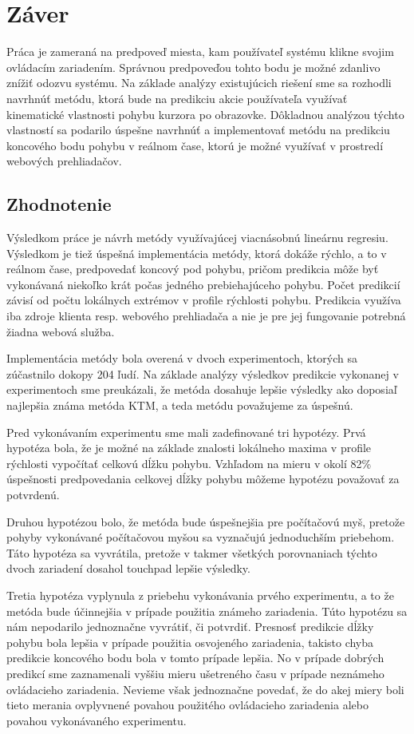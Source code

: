 \chapter{Záver}

Práca je zameraná na predpoveď miesta, kam používateľ systému klikne svojim ovládacím zariadením. Správnou predpoveďou tohto bodu je možné zdanlivo znížiť odozvu systému. Na základe analýzy existujúcich riešení sme sa rozhodli navrhnúť metódu, ktorá bude na predikciu akcie používateľa využívať kinematické vlastnosti pohybu kurzora po obrazovke. Dôkladnou analýzou týchto vlastností sa podarilo úspešne navrhnúť a implementovať metódu na predikciu koncového bodu pohybu v reálnom čase, ktorú je možné využívať v prostredí webových prehliadačov.

\section{Zhodnotenie}
Výsledkom práce je návrh metódy využívajúcej viacnásobnú lineárnu regresiu. Výsledkom je tiež úspešná implementácia metódy, ktorá dokáže rýchlo, a to v reálnom čase, predpovedať koncový pod pohybu, pričom predikcia môže byť vykonávaná niekoľko krát počas jedného prebiehajúceho pohybu. Počet predikcií závisí od počtu lokálnych extrémov v profile rýchlosti pohybu. Predikcia využíva iba zdroje klienta resp. webového prehliadača a nie je pre jej fungovanie potrebná žiadna webová služba.

Implementácia metódy bola overená v dvoch experimentoch, ktorých sa zúčastnilo dokopy 204 ľudí. Na základe analýzy výsledkov predikcie vykonanej v experimentoch sme preukázali, že metóda dosahuje lepšie výsledky ako doposiaľ najlepšia známa metóda KTM, a teda metódu považujeme za úspešnú.

Pred vykonávaním experimentu sme mali zadefinované tri hypotézy. Prvá hypotéza bola, že je možné na základe znalosti lokálneho maxima v profile rýchlosti vypočítať celkovú dĺžku pohybu. Vzhľadom na mieru v okolí 82\% úspešnosti predpovedania celkovej dĺžky pohybu môžeme hypotézu považovať za potvrdenú.

Druhou hypotézou bolo, že metóda bude úspešnejšia pre počítačovú myš, pretože pohyby vykonávané počítačovou myšou sa vyznačujú jednoduchším priebehom. Táto hypotéza sa vyvrátila, pretože v takmer všetkých porovnaniach týchto dvoch zariadení dosahol touchpad lepšie výsledky.

Tretia hypotéza vyplynula z priebehu vykonávania prvého experimentu, a to že metóda bude účinnejšia v prípade použitia známeho zariadenia. Túto hypotézu sa nám nepodarilo jednoznačne vyvrátiť, či potvrdiť. Presnosť predikcie dĺžky pohybu bola lepšia v prípade použitia osvojeného zariadenia, takisto chyba predikcie koncového bodu bola v tomto prípade lepšia. No v prípade dobrých predikcí sme zaznamenali vyššiu mieru ušetreného času v prípade neznámeho ovládacieho zariadenia. Nevieme však jednoznačne povedať, že do akej miery boli tieto merania ovplyvnené povahou použitého ovládacieho zariadenia alebo povahou vykonávaného experimentu.

